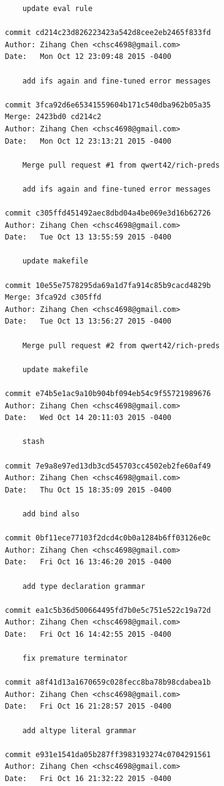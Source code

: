 \documentclass{report}
\begin{document}
\begin{appendices}
\begin{verbatim}
    update eval rule

commit cd214c23d826223423a542d8cee2eb2465f833fd
Author: Zihang Chen <chsc4698@gmail.com>
Date:   Mon Oct 12 23:09:48 2015 -0400

    add ifs again and fine-tuned error messages

commit 3fca92d6e65341559604b171c540dba962b05a35
Merge: 2423bd0 cd214c2
Author: Zihang Chen <chsc4698@gmail.com>
Date:   Mon Oct 12 23:13:21 2015 -0400

    Merge pull request #1 from qwert42/rich-preds
    
    add ifs again and fine-tuned error messages

commit c305ffd451492aec8dbd04a4be069e3d16b62726
Author: Zihang Chen <chsc4698@gmail.com>
Date:   Tue Oct 13 13:55:59 2015 -0400

    update makefile

commit 10e55e7578295da69a1d7fa914c85b9cacd4829b
Merge: 3fca92d c305ffd
Author: Zihang Chen <chsc4698@gmail.com>
Date:   Tue Oct 13 13:56:27 2015 -0400

    Merge pull request #2 from qwert42/rich-preds
    
    update makefile

commit e74b5e1ac9a10b904bf094eb54c9f55721989676
Author: Zihang Chen <chsc4698@gmail.com>
Date:   Wed Oct 14 20:11:03 2015 -0400

    stash

commit 7e9a8e97ed13db3cd545703cc4502eb2fe60af49
Author: Zihang Chen <chsc4698@gmail.com>
Date:   Thu Oct 15 18:35:09 2015 -0400

    add bind also

commit 0bf11ece77103f2dcd4c0b0a1284b6ff03126e0c
Author: Zihang Chen <chsc4698@gmail.com>
Date:   Fri Oct 16 13:46:20 2015 -0400

    add type declaration grammar

commit ea1c5b36d500664495fd7b0e5c751e522c19a72d
Author: Zihang Chen <chsc4698@gmail.com>
Date:   Fri Oct 16 14:42:55 2015 -0400

    fix premature terminator

commit a8f41d13a1670659c028fecc8ba78b98cdabea1b
Author: Zihang Chen <chsc4698@gmail.com>
Date:   Fri Oct 16 21:28:57 2015 -0400

    add altype literal grammar

commit e931e1541da05b287ff3983193274c0704291561
Author: Zihang Chen <chsc4698@gmail.com>
Date:   Fri Oct 16 21:32:22 2015 -0400


\end{verbatim}
\end{appendices}
\end{document}
